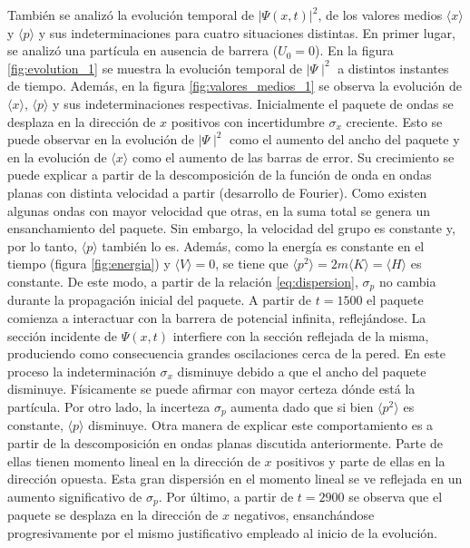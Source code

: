 \documentclass[aps,prb,twocolumn,superscriptaddress,floatfix,longbibliography]{revtex4-2}
\newcounter{para}
\begin{document}
También se analizó la evolución temporal de $|\Psi(x,t)|^2$, de los valores medios $\langle x \rangle$ y $\langle p \rangle$ y sus indeterminaciones para cuatro situaciones distintas. En primer lugar, se analizó una partícula en ausencia de barrera ($U_0 = 0$). En la figura \ref{fig:evolution_1} se muestra la evolución temporal de $\mid \Psi \mid^2$ a distintos instantes de tiempo. Además, en la figura \ref{fig:valores_medios_1} se observa la evolución de $\langle x \rangle$, $\langle p \rangle$ y sus indeterminaciones respectivas. Inicialmente el paquete de ondas se desplaza en la dirección de $x$ positivos con incertidumbre $\sigma_x$ creciente. Esto se puede observar en la evolución de $\mid \Psi \mid^2$ como el aumento del ancho del paquete y en la evolución de $\langle x \rangle$ como el aumento de las barras de error. Su crecimiento se puede explicar a partir de la descomposición de la función de onda en ondas planas con distinta velocidad a partir (desarrollo de Fourier). Como existen algunas ondas con mayor velocidad que otras, en la suma total se genera un ensanchamiento del paquete. Sin embargo, la velocidad del grupo es constante y, por lo tanto, $\langle p \rangle$ también lo es. Además, como la energía es constante en el tiempo (figura \ref{fig:energia}) y $\langle V \rangle = 0$, se tiene que $\langle p^2 \rangle = 2 m \langle K \rangle = \langle H \rangle$ es constante. De este modo, a partir de la relación \ref{eq:dispersion}, $\sigma_p$ no cambia durante la propagación inicial del paquete. A partir de $t = 1500$ el paquete comienza a interactuar con la barrera de potencial infinita, reflejándose. La sección incidente de $\Psi(x,t)$ interfiere con la sección reflejada de la misma, produciendo como consecuencia grandes oscilaciones cerca de la pered. En este proceso la indeterminación $\sigma_x$ disminuye debido a que el ancho del paquete disminuye. Físicamente se puede afirmar con mayor certeza dónde está la partícula. Por otro lado, la incerteza $\sigma_p$ aumenta dado que si bien $\langle p^2 \rangle$ es constante, $\langle p \rangle$ disminuye. Otra manera de explicar este comportamiento es a partir de la descomposición en ondas planas discutida anteriormente. Parte de ellas tienen momento lineal en la dirección de $x$ positivos y parte de ellas en la dirección opuesta. Esta gran dispersión en el momento lineal se ve reflejada en un aumento significativo de $\sigma_p$. Por último, a partir de $t = 2900$ se observa que el paquete se desplaza en la dirección de $x$ negativos, ensanchándose progresivamente por el mismo justificativo empleado al inicio de la evolución.
\end{document}
